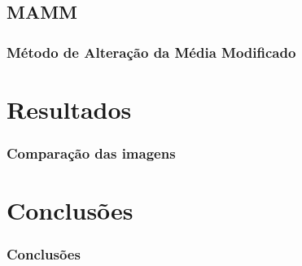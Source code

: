 \documentclass{beamer}
\begin{document}
\subsection{MAMM}
\begin{frame}
\frametitle{Método de Alteração da Média Modificado}

\end{frame}

\section{Resultados}
\begin{frame}
\frametitle{Comparação das imagens}

\end{frame}

\section{Conclusões}
\begin{frame}[fragile] %
\frametitle{Conclusões}

\end{frame}
\end{document}
